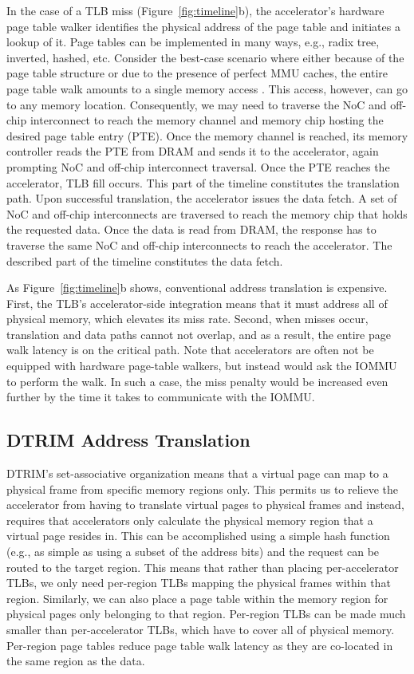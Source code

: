 In the case of a TLB miss (Figure~\ref{fig:timeline}b), the
accelerator's hardware page table walker identifies the physical
address of the page table and initiates a lookup of it. Page tables
can be implemented in many ways, e.g., radix tree, inverted, hashed,
etc. Consider the best-case scenario where either because of the page
table structure or due to the presence of perfect MMU caches, the
entire page table walk amounts to a single memory access
\cite{bhattacharjee:large-reach, barr:translation}. This access,
however, can go to any memory location. Consequently, we may need to
traverse the NoC and off-chip interconnect to reach the memory channel
and memory chip hosting the desired page table entry (PTE). Once the
memory channel is reached, its memory controller reads the PTE from
DRAM and sends it to the accelerator, again prompting NoC and off-chip
interconnect traversal. Once the PTE reaches the accelerator, TLB fill
occurs. This part of the timeline constitutes the translation
path. Upon successful translation, the accelerator issues the data
fetch. A set of NoC and off-chip interconnects are traversed to reach
the memory chip that holds the requested data. Once the data is read
from DRAM, the response has to traverse the same NoC and off-chip
interconnects to reach the accelerator. The described part of the
timeline constitutes the data fetch.

As Figure~\ref{fig:timeline}b shows, conventional address
translation is expensive. First, the TLB's accelerator-side
integration means that it must address all of physical memory, which
elevates its miss rate. Second, when misses occur,
translation and data paths cannot not overlap, and as a result, the entire page walk
latency is on the critical path. Note that accelerators are often not be equipped with hardware page-table walkers, but instead would
ask the IOMMU to perform the walk. In such a case, the miss penalty would be increased even further by the time it takes to communicate with the IOMMU.

\subsection{DTRIM Address Translation}
DTRIM's set-associative organization means that a virtual page can
map to a physical frame from specific memory regions only. This
permits us to relieve the accelerator from having to translate virtual
pages to physical frames and instead, requires that accelerators only
calculate the physical memory region that a virtual page resides in. 
This can be accomplished using a simple hash function (e.g., as simple as using
a subset of the address bits) and the request can be routed to the target region. This means that rather than
placing per-accelerator TLBs, we only need per-region TLBs mapping the
physical frames within that region. Similarly, we can also place a
page table within the memory region for physical pages only belonging
to that region. Per-region TLBs can be made much smaller than
per-accelerator TLBs, which have to cover all of physical
memory. Per-region page tables reduce page table walk latency as
they are co-located in the same region as the data.


